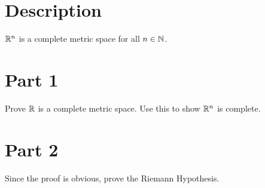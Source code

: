 \documentclass[]{simple}
\begin{document}
\section{Description}
$\mathbb{R}^n$ is a complete metric space for all $n\in\mathbb{N}$.
\section{Part 1}
Prove $\mathbb{R}$ is a complete metric space.
Use this to show $\mathbb{R}^n$ is complete.
\section{Part 2}
Since the proof is obvious, prove the Riemann Hypothesis.
\end{document}
